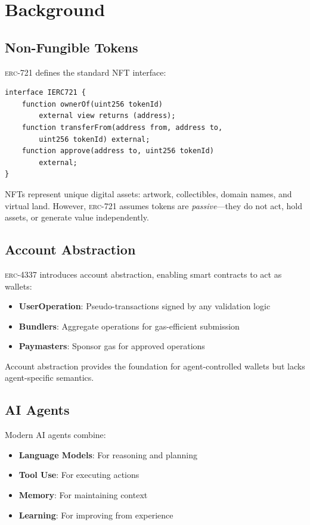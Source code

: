 \documentclass[11pt,letterpaper]{article}
\newcommand{\ERC}{\textsc{erc}}
\begin{document}
\section{Background}

\subsection{Non-Fungible Tokens}

\ERC{}-721 defines the standard NFT interface:

\begin{lstlisting}[language=Solidity,caption=ERC-721 Interface (Simplified)]
interface IERC721 {
    function ownerOf(uint256 tokenId)
        external view returns (address);
    function transferFrom(address from, address to,
        uint256 tokenId) external;
    function approve(address to, uint256 tokenId)
        external;
}
\end{lstlisting}

NFTs represent unique digital assets: artwork, collectibles, domain names, and virtual land. However, \ERC{}-721 assumes tokens are \emph{passive}---they do not act, hold assets, or generate value independently.

\subsection{Account Abstraction}

\ERC{}-4337 introduces account abstraction, enabling smart contracts to act as wallets:

\begin{itemize}
    \item \textbf{UserOperation}: Pseudo-transactions signed by any validation logic
    \item \textbf{Bundlers}: Aggregate operations for gas-efficient submission
    \item \textbf{Paymasters}: Sponsor gas for approved operations
\end{itemize}

Account abstraction provides the foundation for agent-controlled wallets but lacks agent-specific semantics.

\subsection{AI Agents}

Modern AI agents combine:

\begin{itemize}
    \item \textbf{Language Models}: For reasoning and planning
    \item \textbf{Tool Use}: For executing actions
    \item \textbf{Memory}: For maintaining context
    \item \textbf{Learning}: For improving from experience
\end{itemize}
\end{document}
